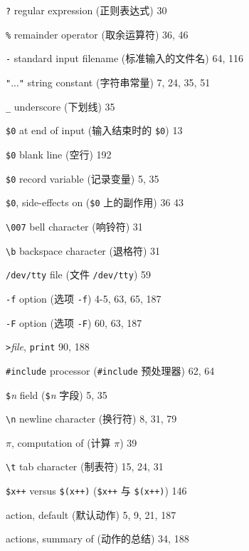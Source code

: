 \begin{multicols}{2}
\hangindent=2pc  \verb'?' regular expression (正则表达式) 30

\hangindent=2pc  \verb'%' remainder operator (取余运算符) 36, 46

\hangindent=2pc  \verb'-' standard input filename
(标准输入的文件名) 64, 116

\hangindent=2pc  \verb'"'...\verb'"' string constant
(字符串常量) 7, 24, 35, 51

\hangindent=2pc  \verb'_' underscore (下划线) 35

\hangindent=2pc  \verb'$0' at end of input (输入结束时的
\verb'$0') 13

\hangindent=2pc  \verb'$0' blank line (空行) 192

\hangindent=2pc  \verb'$0' record variable (记录变量) 5, 35

\hangindent=2pc  \verb'$0', side-effects on (\verb'$0' 上的副作用)
36 43

\hangindent=2pc  \verb'\007' bell character (响铃符) 31

\hangindent=2pc  \verb'\b' backspace character (退格符) 31

\hangindent=2pc  \verb'/dev/tty' file (文件 \verb'/dev/tty') 59

\hangindent=2pc  \verb'-f' option (选项 \verb'-f') 4-5, 63, 65, 187

\hangindent=2pc  \verb'-F' option (选项 \verb'-F') 60, 63, 187

\hangindent=2pc  \verb'>'\textit{file}, \verb'print' 90, 188

\hangindent=2pc  \verb'#include' processor (\verb'#include'
预处理器) 62, 64

\hangindent=2pc  \verb'$'\textit{n} field (\verb'$'\textit{n}
字段) 5, 35

\hangindent=2pc  \verb'\n' newline character (换行符) 8, 31, 79

\hangindent=2pc  $\pi$, computation of (计算 $\pi$) 39

\hangindent=2pc  \verb'\t' tab character (制表符) 15, 24, 31

\hangindent=2pc  \verb'$x++' versus \verb'$(x++)' (\verb'$x++'
与 \verb'$(x++)') 146

\hangindent=2pc  action, default (默认动作) 5, 9, 21, 187

\hangindent=2pc  actions, summary of (动作的总结) 34, 188


\end{multicols}
